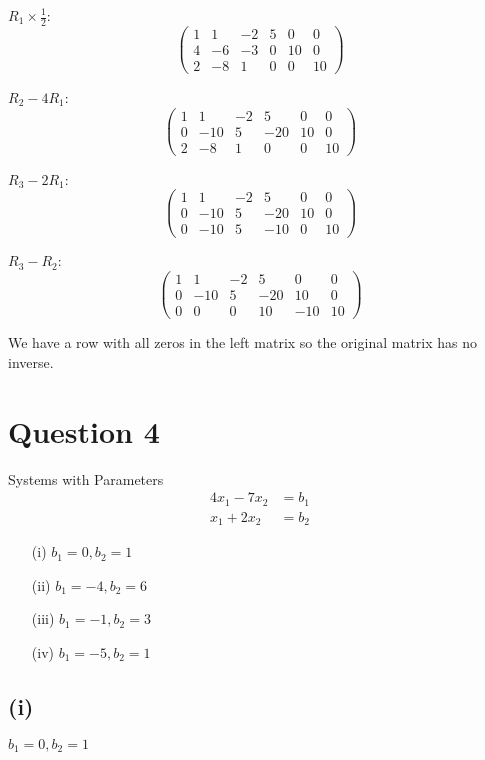 \documentclass[12pt]{article}
\begin{document}
$R_1 \times \frac{1}{2}$:
\[
	\begin{pmatrix}
		1 & 1  & -2 & 5 & 0  & 0  \\
		4 & -6 & -3 & 0 & 10 & 0  \\
		2 & -8 & 1  & 0 & 0  & 10
	\end{pmatrix}
\]

$R_2 - 4R_1$:
\[
	\begin{pmatrix}
		1 & 1   & -2 & 5   & 0  & 0  \\
		0 & -10 & 5  & -20 & 10 & 0  \\
		2 & -8  & 1  & 0   & 0  & 10
	\end{pmatrix}
\]

$R_3 - 2R_1$:
\[
	\begin{pmatrix}
		1 & 1   & -2 & 5   & 0  & 0  \\
		0 & -10 & 5  & -20 & 10 & 0  \\
		0 & -10 & 5  & -10 & 0  & 10
	\end{pmatrix}
\]

$R_3 - R_2$:
\[
	\begin{pmatrix}
		1 & 1   & -2 & 5   & 0  & 0  \\
		0 & -10 & 5  & -20 & 10 & 0  \\
		0 & 0   & 0  & 10  & -10 & 10
	\end{pmatrix}
\]

We have a row with all zeros in the left matrix so the original matrix has no inverse.

\section*{Question 4}
Systems with Parameters
\[
	\begin{aligned}
		4x_1 - 7x_2 & = b_1 \\
		x_1 + 2x_2  & = b_2
	\end{aligned}
\]

\begin{itemize}
	\item[(i)] $b_1 = 0, b_2 = 1$
	\item[(ii)] $b_1 = -4, b_2 = 6$
	\item[(iii)] $b_1 = -1, b_2 = 3$
	\item[(iv)] $b_1 = -5, b_2 = 1$
\end{itemize}

\subsection*{(i)} $b_1 = 0, b_2 = 1$
\end{document}

